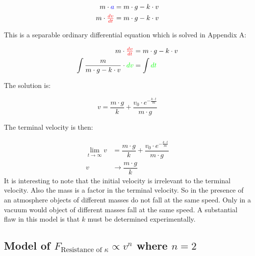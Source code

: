 \documentclass[12pt,letterpaper,final]{article}
\begin{document}
\begin{equation}
\begin{align}
			m \cdot \color{blue}a\color{black} &= m \cdot g - k \cdot v\\
m\cdot \color{red}\tfrac{dv}{dt}\color{black} &= m \cdot g - k \cdot v
\end{align}
\end{equation}

This is a separable ordinary differential equation which is solved in Appendix A:

\begin{equation}
\begin{align}
					m\cdot\color{red}\tfrac{dv}{dt}\color{black} &= m \cdot g - k \cdot v\\				
\int\dfrac{m}{m \cdot g - k \cdot v}\cdot \color{green}dv\color{black} &= \int \color{green}dt\color{black}\\
\end{align}
\end{equation}

The solution is:

\begin{equation}
v = \dfrac{m \cdot g}{k} + \dfrac{v_{0}\cdot \textit{e}^{-\tfrac{k \cdot t}{m}}}{m \cdot g}
\end{equation}

The terminal velocity is then:

\begin{equation}
\begin{align}
\lim_{t \to \infty} v &= \dfrac{m \cdot g}{k} + \dfrac{v_{0}\cdot \textit{e}^{-\tfrac{k \cdot t}{m}}}{m \cdot g}\\
					v &\to \dfrac{m \cdot g}{k}
\end{align}
\end{equation}
It is interesting to note that the initial velocity is irrelevant to the terminal velocity. Also the mass is a factor in the terminal velocity. So in the presence of an atmosphere objects of different masses do not fall at the same speed. Only in a vacuum would object of different masses fall at the same speed. A substantial flaw in this model is that $k$ must be determined experimentally.\\

\subsection{Model of $F_{\text{Resistance of }\kappa} \propto v^{n}$ where $n = 2$}
\end{document}
